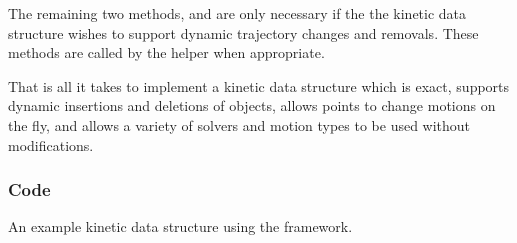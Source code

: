The remaining two methods,  and  are only
necessary if the the kinetic data structure wishes to support dynamic
trajectory changes and removals. These methods are called by the
 helper when appropriate.

That is all it takes to implement a kinetic data structure which is
exact, supports dynamic insertions and deletions of objects, allows
points to change motions on the fly, and allows a variety of solvers
and motion types to be used without modifications.

\subsubsection{Code}
\label{fig:example_program}
An example kinetic data structure using the framework.  
